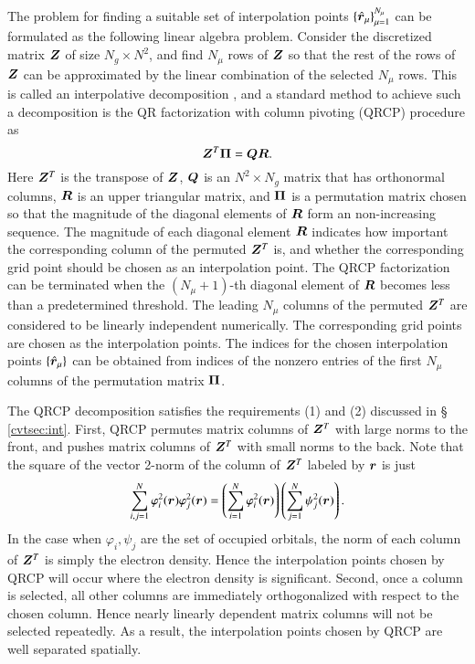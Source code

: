 The problem for finding a suitable set of interpolation points $\{\smash{\hat{\bm{r}}}_\mu\}_
{\mu=1}^{N_{\mu}}$ can be formulated as the following linear algebra problem.
Consider the discretized matrix $\bm{Z}$ of size $N_{g}\times N^2$, and find $N_
{\mu}$ rows of $\bm{Z}$ so that the rest of the rows of $\bm{Z}$ can be approximated
by the linear combination of the selected $N_{\mu}$ rows. This is called an
interpolative decomposition \cite{SIAM_13_727_1992_QRCP}, and a standard method
to achieve such a decomposition is the QR factorization with column pivoting 
(QRCP) procedure \cite{SIAM_13_727_1992_QRCP} as
\begin{equation}\label{eqn:QRCP}
  \bm{Z}^{T} \bm{\Pi} = \bm{Q}\bm{R}.
\end{equation}
Here $\bm{Z}^T$ is the transpose of $\bm{Z}$, $\bm{Q}$ is an $N^2 \times N_g$ matrix that
has orthonormal columns, $\bm{R}$ is an upper triangular matrix, and $\bm{\Pi}$ is a
permutation matrix chosen so that the magnitude of the diagonal elements of
$\bm{R}$ form an non-increasing sequence.  The magnitude of each diagonal element
$\bm{R}$ indicates how important the corresponding column of the permuted $\bm{Z}^T$
is, and whether the corresponding grid point should be chosen as an
interpolation point. The QRCP factorization can be terminated when the $(N_
{\mu}+1)$-th diagonal element of $\bm{R}$ becomes less than a predetermined
threshold. The leading $N_{\mu}$ columns of the permuted $\bm{Z}^T$ are considered
to be linearly independent numerically. The corresponding grid points are chosen
as the interpolation points. The indices for the chosen interpolation points $
\{\smash{\hat{\bm{r}}}_\mu\}$ can be obtained from indices of the nonzero entries of the first
$N_{\mu}$ columns of the permutation matrix $\bm{\Pi}$.

The QRCP decomposition satisfies the requirements (1) and (2) discussed in \S
\ref{cvtsec:int}. First, QRCP permutes matrix columns of $\bm{Z}^{T}$ with large
norms to the front, and pushes matrix columns of $\bm{Z}^{T}$ with small norms to
the back. Note that the square of the vector 2\hyp{}norm of the column of $\bm{Z}^
{T}$ labeled by $\bm{r}$ is just
\begin{equation}\label{eqn:Znorm}
  \sum_{i,j=1}^{N} \varphi_{i}^2(\bm{r}) \varphi_{j}^2(\bm{r}) =
  \left(\sum_{i=1}^{N} \varphi_{i}^2(\bm{r})\right) \left(\sum_{j=1}^{N}
  \psi_{j}^2(\bm{r})\right).
\end{equation}
In the case when $\varphi_{i},\psi_{j}$ are the set of occupied orbitals, the
norm of each column of $\bm{Z}^{T}$ is simply the electron density. Hence the
interpolation points chosen by QRCP will occur where the electron density is
significant. Second, once a column is selected, all other columns are
immediately orthogonalized with respect to the chosen column. Hence nearly
linearly dependent matrix columns will not be selected repeatedly. As a result,
the interpolation points chosen by QRCP are well separated spatially.

